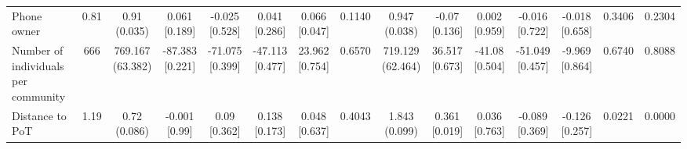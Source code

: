 \documentclass[
]{article}
\begin{document}
\begin{table}[htbp]
{\begin{tabular}[t]{lcccccccccccccc}
\hspace{1em}Phone owner & 0.81 & \makecell[c]{0.91\\(0.035)} & \makecell[c]{0.061\\{[0.189]}} & \makecell[c]{-0.025\\{[0.528]}} & \makecell[c]{0.041\\{[0.286]}} & \makecell[c]{0.066\\{[0.047]}} & 0.1140 & \makecell[c]{0.947\\(0.038)} & \makecell[c]{-0.07\\{[0.136]}} & \makecell[c]{0.002\\{[0.959]}} & \makecell[c]{-0.016\\{[0.722]}} & \makecell[c]{-0.018\\{[0.658]}} & 0.3406 & 0.2304\\
\hspace{1em}Number of individuals per community & 666 & \makecell[c]{769.167\\(63.382)} & \makecell[c]{-87.383\\{[0.221]}} & \makecell[c]{-71.075\\{[0.399]}} & \makecell[c]{-47.113\\{[0.477]}} & \makecell[c]{23.962\\{[0.754]}} & 0.6570 & \makecell[c]{719.129\\(62.464)} & \makecell[c]{36.517\\{[0.673]}} & \makecell[c]{-41.08\\{[0.504]}} & \makecell[c]{-51.049\\{[0.457]}} & \makecell[c]{-9.969\\{[0.864]}} & 0.6740 & 0.8088\\
\hspace{1em}Distance to PoT & 1.19 & \makecell[c]{0.72\\(0.086)} & \makecell[c]{-0.001\\{[0.99]}} & \makecell[c]{0.09\\{[0.362]}} & \makecell[c]{0.138\\{[0.173]}} & \makecell[c]{0.048\\{[0.637]}} & 0.4043 & \makecell[c]{1.843\\(0.099)} & \makecell[c]{0.361\\{[0.019]}} & \makecell[c]{0.036\\{[0.763]}} & \makecell[c]{-0.089\\{[0.369]}} & \makecell[c]{-0.126\\{[0.257]}} & 0.0221 & 0.0000\\
\bottomrule
\end{tabular}}

\end{table}
\end{document}
